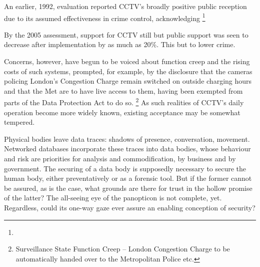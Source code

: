 {An earlier, 1992, evaluation reported CCTV's broadly positive public
reception due to its assumed effectiveness in crime control,
acknowledging  \footnote{}

By the 2005 assessment, support for CCTV still  but public support was seen to decrease after
implementation by as much as 20\%. This 
but  to lower crime.

Concerns, however, have begun to be voiced about function creep and the
rising costs of such systems, prompted, for example, by the disclosure
that the cameras policing London's Congestion Charge remain switched on
outside charging hours and that the Met are to have live access to
them, having been exempted from parts of the Data Protection Act to do
so. \footnote{Surveillance State Function Creep {--} London Congestion Charge
 to be automatically handed over to the
Metropolitan Police etc. } As such realities of CCTV's daily operation become more widely
known, existing acceptance may be somewhat tempered.

Physical bodies leave data traces: shadows of presence, conversation,
movement. Networked databases incorporate these traces into data
bodies, whose behaviour and risk are priorities for analysis and
commodification, by business and by government. The securing of a data
body is supposedly necessary to secure the human body, either
preventatively or as a forensic tool. But if the former cannot be
assured, as is the case, what grounds are there for trust in the hollow
promise of the latter? The all{}-seeing eye of the panopticon is not
complete, yet. Regardless, could its one{}-way gaze ever assure an
enabling conception of security?
}